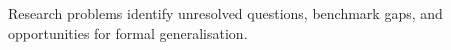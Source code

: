 Research problems identify unresolved questions, benchmark gaps, and opportunities for formal generalisation.
